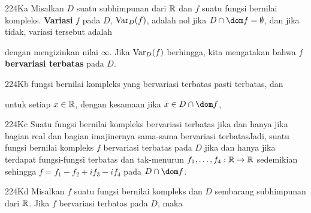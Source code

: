 
\spheader 224Ka Misalkan $D$ suatu subhimpunan dari $\Bbb R$ dan $f$
suatu fungsi bernilai kompleks. {\bf Variasi} $f$ pada $D$, $\mathop{\text{Var}}_D(f)$,
adalah nol jika $D\cap\dom f=\emptyset$, dan jika tidak, variasi tersebut
adalah


\noindent dengan mengizinkan nilai $\infty$.
Jika $\mathop{\text{Var}}_{D}(f)$ berhingga, kita mengatakan bahwa $f$ {\bf bervariasi
terbatas} pada $D$.

\spheader 224Kb  fungsi
bernilai kompleks yang bervariasi terbatas pasti terbatas, dan



\noindent untuk setiap
$x\in\Bbb R$, dengan kesamaan jika $x\in D\cap\dom f$,



\spheader 224Kc Suatu fungsi bernilai kompleks bervariasi terbatas jika
dan hanya jika bagian real dan bagian imajinernya sama-sama bervariasi
terbatasJadi, suatu fungsi bernilai kompleks $f$ bervariasi terbatas
pada $D$ jika dan hanya jika terdapat fungsi-fungsi terbatas dan
tak-menurun $f_1,\ldots,f_4:\Bbb R\to\Bbb R$ sedemikian sehingga
$f=f_1-f_2+if_3-if_4$ pada $D\cap\dom f$.

\spheader 224Kd Misalkan $f$ suatu fungsi bernilai kompleks dan $D$
sembarang subhimpunan dari $\Bbb R$. Jika $f$ bervariasi terbatas pada
$D$, maka

